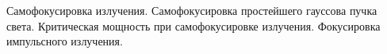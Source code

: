 
\begin{leftrules}
Самофокусировка излучения. Самофокусировка простейшего гауссова пучка света. Критическая мощность при самофокусировке излучения. Фокусировка импульсного излучения.
\end{leftrules}

